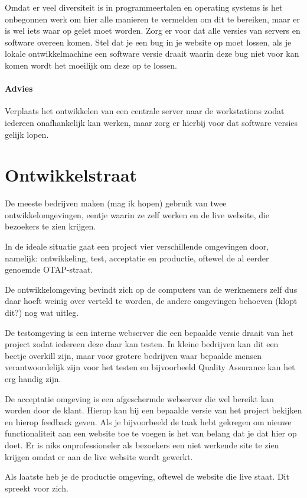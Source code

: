 Omdat er veel diversiteit is in programmeertalen en operating systems is het onbegonnen werk om hier alle manieren te vermelden om dit te bereiken, maar er is wel iets waar op gelet moet worden. Zorg er voor dat alle versies van servers en software overeen komen. Stel dat je een bug in je website op moet lossen, als je lokale ontwikkelmachine een software versie draait waarin deze bug niet voor kan komen wordt het moeilijk om deze op te lossen.

\paragraph{Advies} Verplaats het ontwikkelen van een centrale server naar de workstations zodat iedereen onafhankelijk kan werken, maar zorg er hierbij voor dat software versies gelijk lopen.

\section{Ontwikkelstraat}

De meeste bedrijven maken (mag ik hopen) gebruik van twee ontwikkelomgevingen, eentje waarin ze zelf werken en de live website, die bezoekers te zien krijgen.

In de ideale situatie gaat een project vier verschillende omgevingen door, namelijk: ontwikkeling, test, acceptatie en productie, oftewel de al eerder genoemde OTAP-straat. 

De ontwikkelomgeving bevindt zich op de computers van de werknemers zelf dus daar hoeft weinig over verteld te worden, de andere omgevingen behoeven (klopt dit?) nog wat uitleg.

De testomgeving is een interne webserver die een bepaalde versie draait van het project zodat iedereen deze daar kan testen. In kleine bedrijven kan dit een beetje overkill zijn, maar voor grotere bedrijven waar bepaalde mensen verantwoordelijk zijn voor het testen en bijvoorbeeld Quality Assurance kan het erg handig zijn.

De acceptatie omgeving is een afgeschermde webserver die wel bereikt kan worden door de klant. Hierop kan hij een bepaalde versie van het project bekijken en hierop feedback geven. Als je bijvoorbeeld de taak hebt gekregen om nieuwe functionaliteit aan een website toe te voegen is het van belang dat je dat hier op doet. Er is niks onprofessioneler als bezoekers een niet werkende site te zien krijgen omdat er aan de live website wordt gewerkt.

Als laatste heb je de productie omgeving, oftewel de website die live staat. Dit spreekt voor zich.

